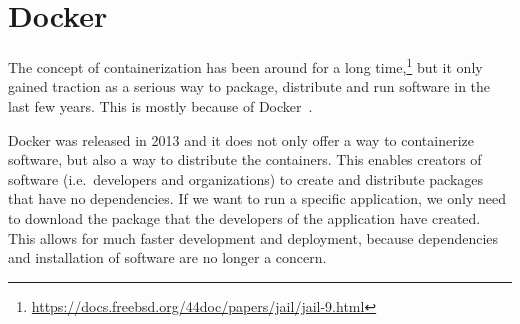 \section{Docker}\label{background:docker}
The concept of containerization has been around for a long time,\footnote{\url{https://docs.freebsd.org/44doc/papers/jail/jail-9.html}} but it only gained traction as a serious way to package, distribute and run software in the last few years. This is mostly because of Docker~\cite{Docker-Popular}.

\medskip

Docker was released in 2013 and it does not only offer a way to containerize software, but also a way to distribute the containers. This enables creators of software (i.e.\ developers and organizations) to create and distribute packages that have no dependencies. If we want to run a specific application, we only need to download the package that the developers of the application have created. This allows for much faster development and deployment, because dependencies and installation of software are no longer a concern.









